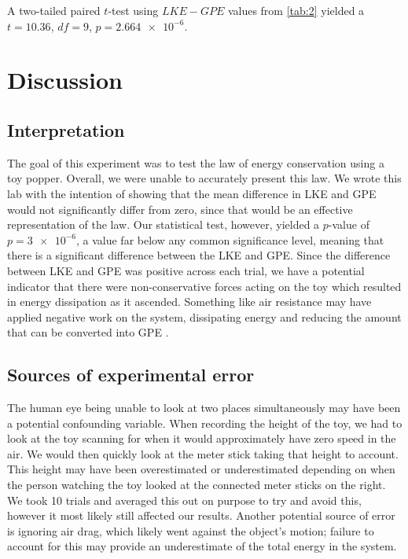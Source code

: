 \documentclass[reprint,amsmath,amssymb,aps,twoside]{revtex4-2} %
\begin{document}
A two-tailed paired $t$-test using $LKE-GPE$ values from \cref{tab:2} yielded a $t=10.36$, $df=9$, $p=\num{2.664e-6}$.











\section{Discussion}

\subsection{Interpretation}
The goal of this experiment was to test the law of energy conservation using a toy popper. Overall, we were unable to accurately present this law. We wrote this lab with the intention of showing that the mean difference in LKE and GPE would not significantly differ from zero, since that would be an effective representation of the law. Our statistical test, however, yielded a $p$-value of $p=\num{3e-6}$, a value far below any common significance level, meaning that there is a significant difference between the LKE and GPE. Since the difference between LKE and GPE was positive across each trial, we have a potential indicator that there were non-conservative forces acting on the toy which resulted in energy dissipation as it ascended. Something like air resistance may have applied negative work on the system, dissipating energy and reducing the amount that can be converted into GPE \cite{tipler,barrons,openstax}.

\subsection{Sources of experimental error}
The human eye being unable to look at two places simultaneously may have been a potential confounding variable. When recording the height of the toy, we had to look at the toy scanning for when it would approximately have zero speed in the air. We would then quickly look at the meter stick taking that height to account. This height may have been overestimated or underestimated depending on when the person watching the toy looked at the connected meter sticks on the right. We took 10 trials and averaged this out on purpose to try and avoid this, however it most likely still affected our results. Another potential source of error is ignoring air drag, which likely went against the object’s motion; failure to account for this may provide an underestimate of the total energy in the system.
\end{document}
